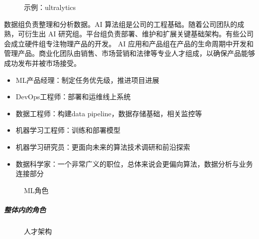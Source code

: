 \documentclass[letterpaper,10pt,english]{sphinxmanual}
\begin{document}
\begin{figure}[H]
\centering
\capstart

\noindent{}
\caption{示例：ultralytics}\label{\detokenize{chapter_introduction/AI_PM:id55}}\end{figure}

数据组负责整理和分析数据。AI
算法组是公司的工程基础。随着公司团队的成熟，可衍生出 AI
研究组。平台组负责部署、维护和扩展关键基础架构。有些公司会成立硬件组专注物理产品的开发。
AI
应用和产品组在产品的生命周期中开发和管理产品。商业化团队由销售、市场营销和法律等专业人才组成，以确保产品能够成功发布并被市场接受。
\begin{itemize}
\item {} 
ML产品经理：制定任务优先级，推进项目进展

\item {} 
DevOps工程师：部署和运维线上系统

\item {} 
数据工程师：构建data pipeline，数据存储基础，相关监控等

\item {} 
机器学习工程师：训练和部署模型

\item {} 
机器学习研究员：更面向未来的算法技术调研和前沿探索

\item {} 
数据科学家：一个非常广义的职位，总体来说会更偏向算法，数据分析与业务连接部分

\end{itemize}

\begin{figure}[H]
\centering
\capstart

\noindent{}
\caption{ML角色}\label{\detokenize{chapter_introduction/AI_PM:id56}}\end{figure}


\subparagraph{整体内的角色}
\label{\detokenize{chapter_introduction/AI_PM:id15}}
\begin{figure}[H]
\centering
\capstart

\noindent{}
\caption{人才架构\sphinxfootnotemark[284]}\label{\detokenize{chapter_introduction/AI_PM:id57}}\end{figure}
%
\begin{footnotetext}[284]\sphinxAtStartFootnote
{}
%
\end{footnotetext}\ignorespaces 
\end{document}
